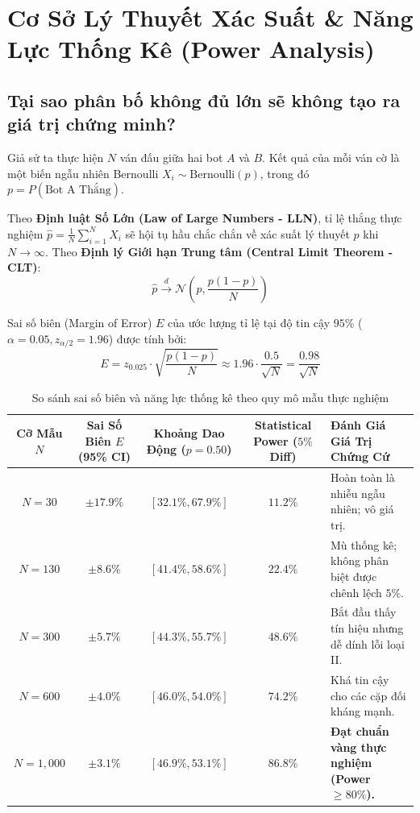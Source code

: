 \documentclass[11pt,a4paper]{article}
\begin{document}
\section{Cơ Sở Lý Thuyết Xác Suất \& Năng Lực Thống Kê (Power Analysis)}

\subsection{Tại sao phân bố không đủ lớn sẽ không tạo ra giá trị chứng minh?}
Giả sử ta thực hiện $N$ ván đấu giữa hai bot $A$ và $B$. Kết quả của mỗi ván cờ là một biến ngẫu nhiên Bernoulli $X_i \sim \text{Bernoulli}(p)$, trong đó $p = P(\text{Bot A Thắng})$.

Theo \textbf{Định luật Số Lớn (Law of Large Numbers - LLN)}, tỉ lệ thắng thực nghiệm $\hat{p} = \frac{1}{N} \sum_{i=1}^N X_i$ sẽ hội tụ hầu chắc chắn về xác suất lý thuyết $p$ khi $N \to \infty$. Theo \textbf{Định lý Giới hạn Trung tâm (Central Limit Theorem - CLT)}:
\begin{equation}
\hat{p} \xrightarrow{d} \mathcal{N}\left(p, \frac{p(1-p)}{N}\right)
\label{eq:clt}
\end{equation}

Sai số biên (Margin of Error) $E$ của ước lượng tỉ lệ tại độ tin cậy $95\%$ ($\alpha = 0.05, z_{\alpha/2} = 1.96$) được tính bởi:
\begin{equation}
E = z_{0.025} \cdot \sqrt{\frac{p(1-p)}{N}} \approx 1.96 \cdot \frac{0.5}{\sqrt{N}} = \frac{0.98}{\sqrt{N}}
\label{eq:margin_error}
\end{equation}

\begin{table}[htbp]
\centering
\small
\caption{So sánh sai số biên và năng lực thống kê theo quy mô mẫu thực nghiệm}
\label{tab:power_comparison}
\begin{tabularx}{\textwidth}{c c c c X}
\toprule
\textbf{Cỡ Mẫu $N$} & \textbf{Sai Số Biên $E$ (95\% CI)} & \textbf{Khoảng Dao Động ($p=0.50$)} & \textbf{Statistical Power ($5\%$ Diff)} & \textbf{Đánh Giá Giá Trị Chứng Cứ} \\
\midrule
$N = 30$   & $\pm 17.9\%$ & $[32.1\%, 67.9\%]$ & $11.2\%$ & Hoàn toàn là nhiễu ngẫu nhiên; vô giá trị. \\
$N = 130$  & $\pm 8.6\%$  & $[41.4\%, 58.6\%]$ & $22.4\%$ & Mù thống kê; không phân biệt được chênh lệch $5\%$. \\
$N = 300$  & $\pm 5.7\%$  & $[44.3\%, 55.7\%]$ & $48.6\%$ & Bắt đầu thấy tín hiệu nhưng dễ dính lỗi loại II. \\
$N = 600$  & $\pm 4.0\%$  & $[46.0\%, 54.0\%]$ & $74.2\%$ & Khá tin cậy cho các cặp đối kháng mạnh. \\
\textbf{$N = 1{,}000$} & \textbf{$\pm 3.1\%$} & \textbf{$[46.9\%, 53.1\%]$} & \textbf{$86.8\%$} & \textbf{Đạt chuẩn vàng thực nghiệm (Power $\ge 80\%$).} \\
\bottomrule
\end{tabularx}
\end{table}
\end{document}
